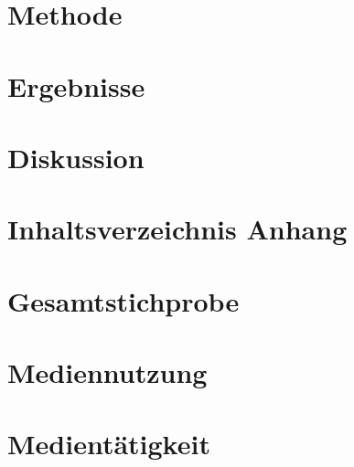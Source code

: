 \section{Methode}\label{sec:Methode}


\section{Ergebnisse}\label{sec:Ergebnisse}


\section{Diskussion}\label{sec:Diskussion}


\begin{flushleft}
\nocite{}
{}
\end{flushleft}

\newpage


\appendix 
\renewcommand{\appendixname}{Anhang}
\renewcommand\appendixtocname{Anhang}
\renewcommand{\appendixpagename}{Anhang}
\addappheadtotoc

\section{Inhaltsverzeichnis Anhang}\label{app:Inhaltsverzeichnis}

\newpage

\section{Gesamtstichprobe}\label{app:Gesamtstichprobe}

\newpage

\section{Mediennutzung}\label{app:Mediennutzung}

\newpage

\section{Medientätigkeit}\label{app:Medientätigkeit}

\newpage

